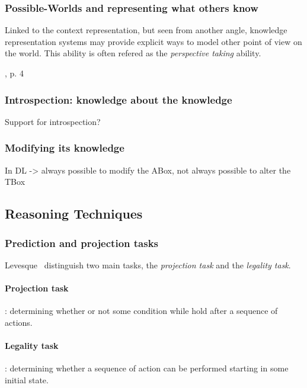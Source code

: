 \documentclass[a4paper, twocolumn]{article}
\begin{document}
\subsubsection{Possible-Worlds and representing what others know}
\label{sect|possible-worlds}

    
Linked to the context representation, but seen from another angle, knowledge
representation systems may provide explicit ways to model other point of view
on the world. This ability is often refered as the \emph{perspective taking}
ability.

\cite{Levesque2008}, p. 4

\subsubsection{Introspection: knowledge about the knowledge}
\label{sect|introspection}
Support for introspection?

\subsubsection{Modifying its knowledge}

In DL -> always possible to modify the ABox, not always possible to alter the TBox


\subsection{Reasoning Techniques}

\subsubsection{Prediction and projection tasks}
\label{sect|prediction-projection}

Levesque~\cite{Levesque2008} distinguish two main tasks, the \emph{projection task} and the \emph{legality task}.

\paragraph{Projection task}: determining whether or not some condition while hold after a sequence of actions.

\paragraph{Legality task}: determining whether a sequence of action can be performed starting in some initial state.
\end{document}
